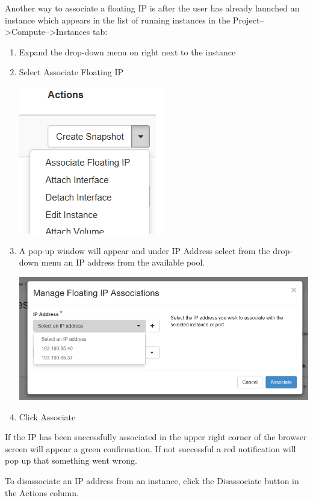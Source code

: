 Another way to associate a floating IP is after the user has already launched an instance which appears in the list of running instances in the Project-->Compute-->Instances tab:

\begin{enumerate}
\item Expand the drop-down menu on right next to the instance
\item Select Associate Floating IP
\begin{center}
\includegraphics[scale=0.7]{img/associate_IP_1.png}
\end{center}
\item A pop-up window will appear and under IP Address select from the
  drop-down menu an IP address from the available pool.
\begin{center}
\includegraphics[scale=0.5]{img/associate_IP_2.png}
\end{center}
\item Click Associate
\end{enumerate}

If the IP has been successfully associated in the upper right corner of the browser screen will appear a green confirmation. If not successful a red notification will pop up that something went wrong.

 To disassociate an IP address from an instance, click
the Disassociate button in the Actions column.

